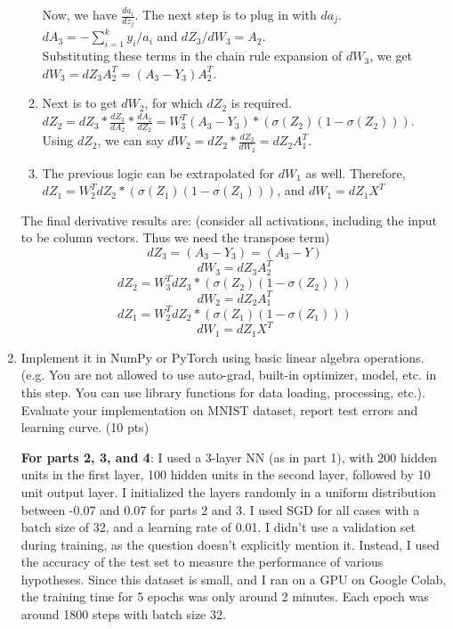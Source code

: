 \documentclass[a4paper]{article}
\theoremstyle{definition}
\newenvironment{soln}{
    \leavevmode\color{blue}\ignorespaces
}{}
\begin{document}
\begin{enumerate}
\begin{soln}
\begin{enumerate}
        Now, we have $\frac{da_i}{dz_j}$. The next step is to plug in with $da_j$.\\

        $dA_3=-\sum_{i=1}^k y_i/a_i$ and $dZ_3/dW_3=A_2$.\\

        Substituting these terms in the chain rule expansion of $dW_3$, we get $dW_3=dZ_3A_2^T=(A_3-Y_3)A_2^T$.

        \item Next is to get $dW_2$, for which $dZ_2$ is required. \\
        $dZ_2=dZ_3*\frac{dZ_3}{dA_2}*\frac{dA_2}{dZ_2}=W_3^T(A_3-Y_3)*(\sigma(Z_2)(1-\sigma(Z_2)))$.\\
        Using $dZ_2$, we can say $dW_2=dZ_2*\frac{dZ_2}{dW_2}=dZ_2A_1^T$.

        \item The previous logic can be extrapolated for $dW_1$ as well. Therefore, $dZ_1=W_2^TdZ_2*(\sigma(Z_1)(1-\sigma(Z_1)))$, and $dW_1=dZ_1X^T$
        \end{enumerate} 

        The final derivative results are: (consider all activations, including the input to be column vectors. Thus we need the transpose term)
        $$dZ_3=(A_3-Y_3)=(A_3-Y)$$
        $$dW_3=dZ_3A_2^T$$
        $$dZ_2=W_3^TdZ_3*(\sigma(Z_2)(1-\sigma(Z_2)))$$
        $$dW_2=dZ_2A_1^T$$
        $$dZ_1=W_2^TdZ_2*(\sigma(Z_1)(1-\sigma(Z_1)))$$
        $$dW_1=dZ_1X^T$$
    \end{soln}
    \item Implement it in NumPy or PyTorch using basic linear algebra operations. (e.g. You are not allowed to use auto-grad, built-in optimizer, model, etc. in this step. You can use library functions for data loading, processing, etc.). Evaluate your implementation on MNIST dataset, report test errors and learning curve. (10 pts)
        \begin{soln}
        \textbf{For parts 2, 3, and 4}: I used a 3-layer NN (as in part 1), with 200 hidden units in the first layer, 100 hidden units in the second layer, followed by 10 unit output layer. I initialized the layers randomly in a uniform distribution between -0.07 and 0.07 for parts 2 and 3. I used SGD for all cases with a batch size of 32, and a learning rate of 0.01. I didn't use a validation set during training, as the question doesn't explicitly mention it. Instead, I used the accuracy of the test set to measure the performance of various hypotheses. Since this dataset is small, and I ran on a GPU on Google Colab, the training time for 5 epochs was only around 2 minutes. Each epoch was around 1800 steps with batch size 32. 


\end{soln}
\end{enumerate}
\end{document}

